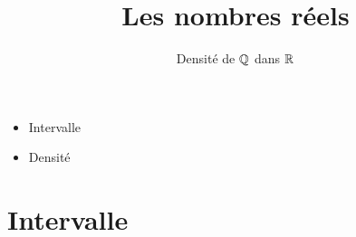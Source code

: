 










\title{{\bf Les nombres réels}}
\subtitle{Densité de $\mathbb{Q}$ dans $\mathbb{R}$}

\begin{frame}
  
  \debutmontitre

  \pause

{\footnotesize
\hfill
{}
\begin{minipage}{0.6\textwidth}
  \begin{itemize}
    \item<3-> Intervalle
    \item<4-> Densité
  \end{itemize}
\end{minipage}
}

\end{frame}

\setcounter{framenumber}{0}


\section*{Intervalle}

